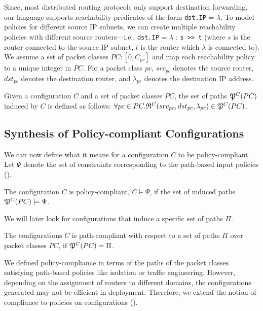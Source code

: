 

Since, most distributed routing protocols only support
destination forwarding, our language supports reachability predicates 
of the form \texttt{dst.IP} = $\lambda$. To 
model policies for different source IP subnets, we can create
multiple reachability policies with different source routers---i.e.,
\texttt{dst.IP} = $\lambda$ : \texttt{s >> t} (where $s$ is
the router connected to the source IP subnet, $t$ is the router
which $\lambda$ is connected to).
We assume a set of packet classes $PC : [0,C_{pc}]$ 
and map each reachability policy to a unique integer in $PC$.
For a packet class $pc$, $src_{pc}$ denotes the source router,
$dst_{pc}$ denotes the destination router, and $\lambda_{pc}$
denotes the destination IP address. 


\begin{definition}
Given a configuration $C$ and a set of packet classes $PC$, the set of paths
$\mathfrak{P}^C(PC)$ induced by $C$ is defined as follows: 
$\forall pc \in PC. \mathfrak{R}^C(src_{pc}, dst_{pc}, \lambda_{pc}) \in \mathfrak{P}^C(PC)$.
\end{definition}

\subsection{Synthesis of Policy-compliant Configurations}




\noindent We can now define what it means for a configuration $C$ to be policy-compliant. Let 
$\Psi$ denote the set of constraints corresponding to the 
path-based input policies (). 
\begin{definition}
	The configuration $C$ is policy-compliant,
	$C \models \Psi$, if the set of
	induced paths $\mathfrak{P}^C(PC) \models \Psi$.
\end{definition}

We will later look for configurations that induce a specific set of paths $\Pi$.  
\begin{definition}
	The configurations $C$ is path-compliant with respect to 
	a set of paths $\Pi$ over packet classes $PC$,
	if $\mathfrak{P}^C(PC)=\Pi$.
\end{definition}

We defined policy-compliance in terms of the 
paths of the packet classes satisfying path-based 
policies like isolation or traffic engineering. However,
depending on the assignment of routers to different domains,
the configurations generated may not be efficient
in deployment. Therefore, we extend the notion of 
compliance to policies on configurations 
().

